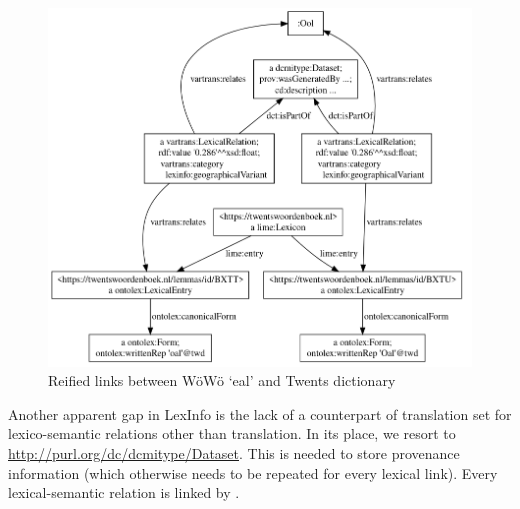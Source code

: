 \begin{figure}
    \centering
    \includegraphics[width=0.9\linewidth]{img/links-vis.png}
    \caption{Reified  links between WöWö  `eal' and Twents dictionary}
    \label{fig-links}
\end{figure}

% 
% 
% 
% 
% 
% 
% 
% 
% 

Another apparent gap in LexInfo is the lack of a counterpart of translation set for lexico-semantic relations other than translation. In its place, we resort to \url{http://purl.org/dc/dcmitype/Dataset}. This is needed to store provenance information (which otherwise needs to be repeated for every lexical link). Every lexical-semantic relation is linked by .